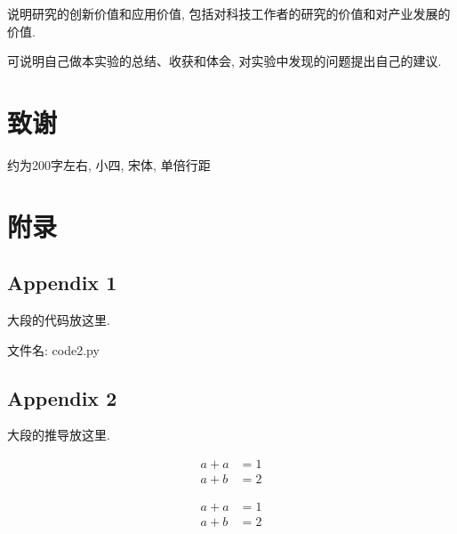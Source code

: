 \documentclass{urtemp}
\begin{document}
说明研究的创新价值和应用价值, 包括对科技工作者的研究的价值和对产业发展的价值. 

可说明自己做本实验的总结、收获和体会, 对实验中发现的问题提出自己的建议. 



{\centering\section*{致谢}}
约为200字左右, 小四, 宋体, 单倍行距


\renewcommand\refname{\heiti\wuhao\centerline{参考文献}\global\def\refname{参考文献}}
\vskip 12pt

\let\OLDthebibliography\thebibliography
\renewcommand\thebibliography[1]{
    \OLDthebibliography{#1}
    \setlength{\parskip}{0pt}
    \setlength{\itemsep}{0pt plus 0.3ex}
}

{
\renewcommand{\baselinestretch}{0.9}


}

\section*{附录}

\subsection*{Appendix 1}

大段的代码放这里.

文件名: code2.py


\subsection*{Appendix 2}

大段的推导放这里.

$$
\begin{aligned}
    a+a&=1\\
    a+b&=2
\end{aligned}
$$

\begin{equation}
\begin{aligned}
    a+a&=1\\
    a+b&=2
\end{aligned}\label{eqA1}
\end{equation}
\end{document}
